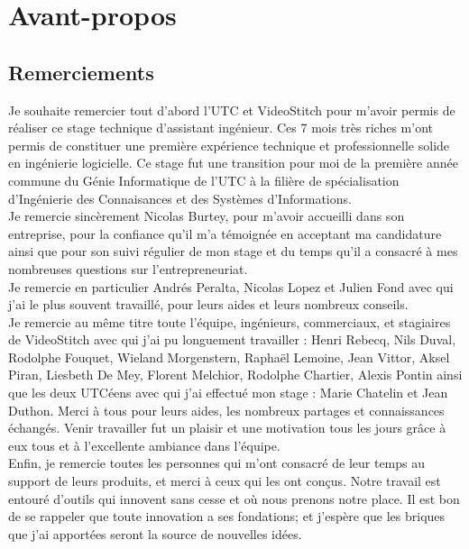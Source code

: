\chapter*{Avant-propos}

\section*{Remerciements}
Je souhaite remercier tout d'abord l'UTC et VideoStitch pour m'avoir permis de 
réaliser ce stage technique d'assistant ingénieur. Ces 7 mois très riches m'ont 
permis de constituer une première expérience technique et professionnelle solide 
en ingénierie logicielle. Ce stage fut une transition pour moi de la première 
année commune du Génie Informatique de l'UTC à la filière de spécialisation 
d'Ingénierie des Connaisances et des Systèmes d'Informations.\\
\newline
Je remercie sincèrement Nicolas Burtey, pour m'avoir accueilli dans son entreprise,
pour la confiance qu'il m'a témoignée en acceptant ma candidature ainsi que pour
son suivi régulier de mon stage et du temps qu'il a consacré à mes nombreuses
questions sur l'entrepreneuriat.\\
Je remercie en particulier Andrés Peralta, Nicolas Lopez et Julien Fond avec qui 
j'ai le plus souvent travaillé, pour leurs aides et leurs nombreux conseils.\\
Je remercie au même titre toute l'équipe, ingénieurs, commerciaux, et stagiaires 
de VideoStitch avec qui j'ai pu longuement travailler :
Henri Rebecq, Nils Duval, Rodolphe Fouquet, Wieland Morgenstern, Raphaël 
Lemoine, Jean Vittor, Aksel Piran, Liesbeth De Mey, Florent Melchior, Rodolphe 
Chartier, Alexis Pontin ainsi que les deux UTCéens avec qui j'ai effectué mon 
stage : Marie Chatelin et Jean Duthon. Merci à tous pour leurs aides, 
les nombreux partages et connaissances échangés. Venir travailler fut un plaisir 
et une motivation tous les jours grâce à eux tous et à l'excellente ambiance dans l'équipe.\\
\newline
Enfin, je remercie toutes les personnes qui m'ont consacré de leur temps au support 
de leurs produits, et merci à ceux qui les ont conçus. Notre travail est entouré 
d'outils qui innovent sans cesse et où nous prenons notre place. Il est bon de 
se rappeler que toute innovation a ses fondations; et j'espère que les briques 
que j'ai apportées seront la source de nouvelles idées.

